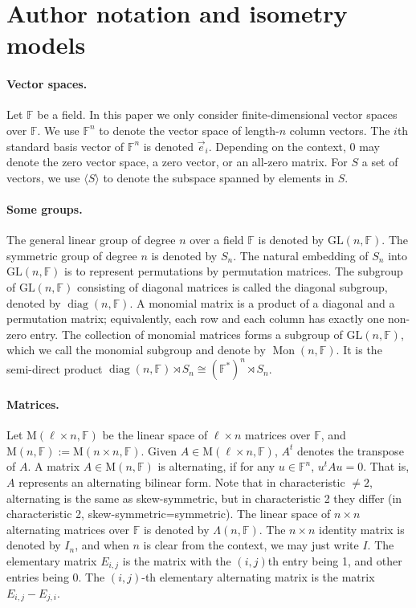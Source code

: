 \section*{Author notation and isometry models}
\paragraph{Vector spaces.} Let $\mathbb F$ be a field. In this paper we only consider finite-dimensional vector spaces over $\mathbb F$. We use $\mathbb F^n$ to denote the vector space of length-$n$ column vectors. The $i$th standard basis vector of $\mathbb F^n$ is denoted $\vec e_i$. Depending on the context, 0 may denote the zero vector space, a zero vector, or an all-zero matrix. For $S$ a set of vectors, we use $\langle S\rangle$ to denote the subspace spanned by elements in $S$.
\paragraph{Some groups.} The general linear group of degree $n$ over a field $\mathbb F$ is denoted by $\mathrm{GL}(n,\mathbb F)$. The symmetric group of degree $n$ is denoted by $S_n$. The natural embedding of $S_n$ into $\mathrm{GL}(n,\mathbb F)$ is to represent permutations by permutation matrices. The subgroup of $\mathrm{GL}(n,\mathbb F)$ consisting of diagonal matrices is called the diagonal subgroup, denoted by $\operatorname{diag}(n,\mathbb F)$. A monomial matrix is a product of a diagonal and a permutation matrix; equivalently, each row and each column has exactly one non-zero entry. The collection of monomial matrices forms a subgroup of $\mathrm{GL}(n,\mathbb F)$, which we call the monomial subgroup and denote by $\operatorname{Mon}(n,\mathbb F)$. It is the semi-direct product $\operatorname{diag}(n,\mathbb F)\rtimes S_n\cong(\mathbb F^*)^n\rtimes S_n$.
\paragraph{Matrices.} Let $\mathrm M(\ell\times n,\mathbb F)$ be the linear space of $\ell\times n$ matrices over $\mathbb F$, and $\mathrm M(n,\mathbb F):=\mathrm M(n\times n,\mathbb F)$. Given $A\in\mathrm M(\ell\times n,\mathbb F)$, $A^t$ denotes the transpose of $A$.
A matrix $A\in\mathrm M(n,\mathbb F)$ is alternating, if for any $u\in\mathbb F^n$, $u^tAu=0$. That is, $A$ represents an alternating bilinear form. Note that in characteristic $\ne2$, alternating is the same as skew-symmetric, but in characteristic 2 they differ (in characteristic 2, skew-symmetric=symmetric). The linear space of $n\times n$ alternating matrices over $\mathbb F$ is denoted by $\Lambda(n,\mathbb F)$.
The $n\times n$ identity matrix is denoted by $I_n$, and when $n$ is clear from the context, we may just write $I$. The elementary matrix $E_{i,j}$ is the matrix with the $(i,j)$th entry being 1, and other entries being 0. The $(i,j)$-th elementary alternating matrix is the matrix $E_{i,j}-E_{j,i}$.
